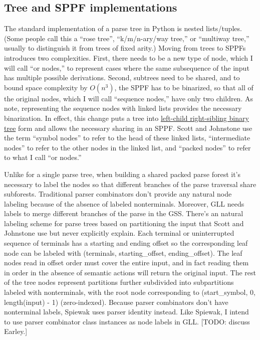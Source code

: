 \documentclass[12pt]{article}
\begin{document}
\subsection{Tree and SPPF implementations}
\label{sec:tree_sppf_implementations}

The standard implementation of a parse tree in Python is nested
lists/tuples.  (Some people call this a ``rose tree'', ``k/m/n-ary/way
tree,'' or ``multiway tree,'' usually to distinguish it from trees of
fixed arity.)  Moving from trees to SPPFs introduces two complexities.
First, there needs to be a new type of node, which I will call ``or
nodes,'' to represent cases where the same subsequence of the input
has multiple possible derivations.  Second, subtrees need to be
shared, and to bound space complexity by $O(n^3)$, the SPPF has to be
binarized\parencite{billot_lang}, so that all of the original nodes,
which I will call ``sequence nodes,'' have only two children.  As
\textcite{billot_lang} note, representing the sequence nodes with
linked lists provides the necessary binarization.  In effect, this
change puts a tree into
\href{https://en.wikipedia.org/wiki/Left-child_right-sibling_binary_tree}{left-child
  right-sibling binary tree} form and allows the necessary sharing in
an SPPF.  Scott and Johnstone use the term ``symbol nodes'' to refer
to the head of these linked lists, ``intermediate nodes'' to refer to
the other nodes in the linked list, and ``packed nodes'' to refer to
what I call ``or nodes.''

Unlike for a single parse tree, when building a shared packed parse
forest it's necessary to label the nodes so that different branches of
the parse traversal share subforests.  Traditional parser combinators
don't provide any natural node labeling because of the absence of
labeled nonterminals.  Moreover, GLL needs labels to merge different
branches of the parse in the GSS.  There's an natural labeling scheme
for parse trees based on partitioning the input that Scott and
Johnstone use but never explicitly explain.  Each terminal or
uninterrupted sequence of terminals has a starting and ending offset
so the corresponding leaf node can be labeled with (terminals,
starting\_offset, ending\_offset).  The leaf nodes read in offset
order must cover the entire input, and in fact reading them in order
in the absence of semantic actions will return the original input.
The rest of the tree nodes represent partitions further subdivided
into subpartitions labeled with nonterminals, with the root node
corresponding to (start\_symbol, 0, length(input) - 1) (zero-indexed).
Because parser combinators don't have nonterminal labels, Spiewak uses
parser identity instead.  Like Spiewak, I intend to use parser
combinator class instances as node labels in GLL.  [TODO: discuss
Earley.]
\end{document}
